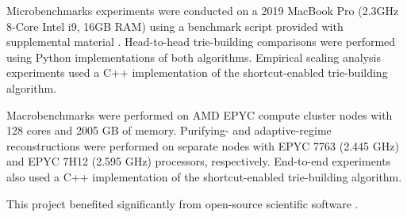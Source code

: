 Microbenchmarks experiments were conducted on a 2019 MacBook Pro (2.3GHz 8-Core Intel i9, 16GB RAM) using a benchmark script provided with supplemental material \citep{supplemental}.
Head-to-head trie-building comparisons were performed using Python implementations of both algorithms.
Empirical scaling analysis experiments used a C++ implementation of the shortcut-enabled trie-building algorithm.

Macrobenchmarks were performed on AMD EPYC compute cluster nodes with 128 cores and 2005 GB of memory.
Purifying- and adaptive-regime reconstructions were performed on separate nodes with EPYC 7763 (2.445 GHz) and EPYC 7H12 (2.595 GHz) processors, respectively.
End-to-end experiments also used a C++ implementation of the shortcut-enabled trie-building algorithm.

This project benefited significantly from open-source scientific software \citep{2020SciPy-NMeth,harris2020array,reback2020pandas,mckinney2010data,waskom2021seaborn,hunter2007matplotlib,moreno2022hstrat,yang2025downstream}.
